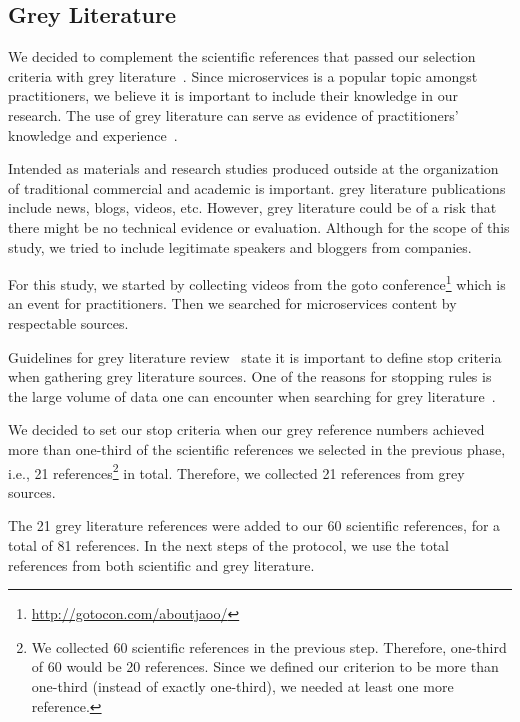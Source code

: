 \subsection{Grey Literature}

We decided to complement the scientific references that passed our selection criteria with grey literature~\cite{Garousi2016}. Since microservices is a popular topic amongst practitioners, we believe it is important to include their knowledge in our research. The use of grey literature can serve as evidence of practitioners' knowledge and experience~\cite{Kamei2019}.

Intended as materials and research studies produced outside at the organization of traditional commercial and academic is important. grey literature publications include news, blogs, videos, etc. However, grey literature could be of a risk that there might be no technical evidence or evaluation. Although for the scope of this study, we tried to include legitimate speakers and bloggers from companies.

For this study, we started by collecting videos from the goto conference\footnote{\url{http://gotocon.com/aboutjaoo/}} which is an event for practitioners. Then we searched for microservices content by respectable sources. 

Guidelines for grey literature review~\cite{Garousi2019} state it is important to define stop criteria when gathering grey literature sources. One of the reasons for stopping rules is the large volume of data one can encounter when searching for grey literature~\cite{Garousi2019}. 

We decided to set our stop criteria when our grey reference numbers achieved more than one-third of the scientific references we selected in the previous phase, i.e., 21 references\footnote{We collected 60 scientific references in the previous step. Therefore, one-third of 60 would be 20 references. Since we defined our criterion to be more than one-third (instead of exactly one-third), we needed at least one more reference.} in total. Therefore, we collected 21 references from grey sources.

The 21 grey literature references were added to our 60 scientific references, for a total of 81 references. %
In the next steps of the protocol, we use the total references from both scientific and grey literature.




